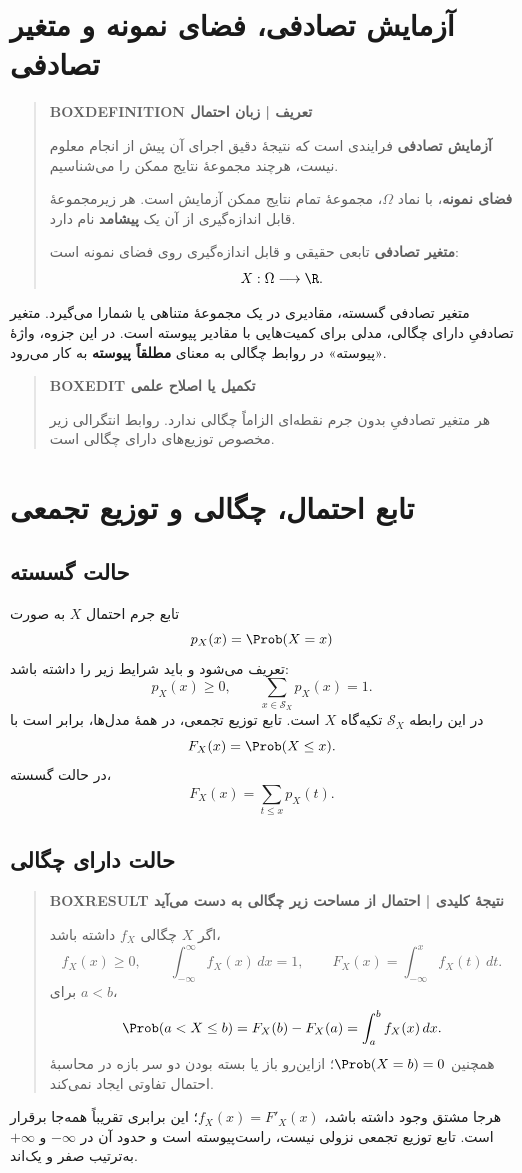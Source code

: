 \section{آزمایش تصادفی، فضای نمونه و متغیر تصادفی}
\begin{quote}\textbf{BOXDEFINITION تعریف | زبان احتمال}\par 
\textbf{آزمایش تصادفی} فرایندی است که نتیجهٔ دقیق اجرای آن پیش از انجام معلوم نیست، هرچند مجموعهٔ نتایج ممکن را می‌شناسیم.

\textbf{فضای نمونه}، با نماد $\Omega$، مجموعهٔ تمام نتایج ممکن آزمایش است. هر زیرمجموعهٔ قابل اندازه‌گیری از آن یک \textbf{پیشامد} نام دارد.

\textbf{متغیر تصادفی} تابعی حقیقی و قابل اندازه‌گیری روی فضای نمونه است:
\[X:\Omega\longrightarrow\R.\]
\end{quote}
متغیر تصادفی گسسته، مقادیری در یک مجموعهٔ متناهی یا شمارا می‌گیرد. متغیر تصادفیِ دارای چگالی، مدلی برای کمیت‌هایی با مقادیر پیوسته است. در این جزوه، واژهٔ «پیوسته» در روابط چگالی به معنای \textbf{مطلقاً پیوسته} به کار می‌رود.
\begin{quote}\textbf{BOXEDIT تکمیل یا اصلاح علمی}\par هر متغیر تصادفیِ بدون جرم نقطه‌ای الزاماً چگالی ندارد. روابط انتگرالی زیر مخصوص توزیع‌های دارای چگالی است.\end{quote}
\section{تابع احتمال، چگالی و توزیع تجمعی}
\subsection{حالت گسسته}
تابع جرم احتمال $X$ به صورت
\[p_X(x)=\Prob(X=x)\]
تعریف می‌شود و باید شرایط زیر را داشته باشد:
\[p_X(x)\ge0,\qquad\sum_{x\in\mathcal S_X}p_X(x)=1.\]
در این رابطه $\mathcal S_X$ تکیه‌گاه $X$ است. تابع توزیع تجمعی، در همهٔ مدل‌ها، برابر است با
\[F_X(x)=\Prob(X\le x).\]
در حالت گسسته،
\[F_X(x)=\sum_{t\le x}p_X(t).\]
\subsection{حالت دارای چگالی}
\begin{quote}\textbf{BOXRESULT نتیجهٔ کلیدی | احتمال از مساحت زیر چگالی به دست می‌آید}\par 
اگر $X$ چگالی $f_X$ داشته باشد،
\[
f_X(x)\ge0,\qquad\int_{-\infty}^{\infty}f_X(x)\,dx=1,
\qquad F_X(x)=\int_{-\infty}^{x}f_X(t)\,dt.
\]
برای $a<b$،
\[\Prob(a<X\le b)=F_X(b)-F_X(a)=\int_a^b f_X(x)\,dx.\]
همچنین $\Prob(X=b)=0$؛ ازاین‌رو باز یا بسته بودن دو سر بازه در محاسبهٔ احتمال تفاوتی ایجاد نمی‌کند.
\end{quote}
هرجا مشتق وجود داشته باشد، $f_X(x)=F'_X(x)$؛ این برابری تقریباً همه‌جا برقرار است. تابع توزیع تجمعی نزولی نیست، راست‌پیوسته است و حدود آن در $-\infty$ و $+\infty$ به‌ترتیب صفر و یک‌اند.



